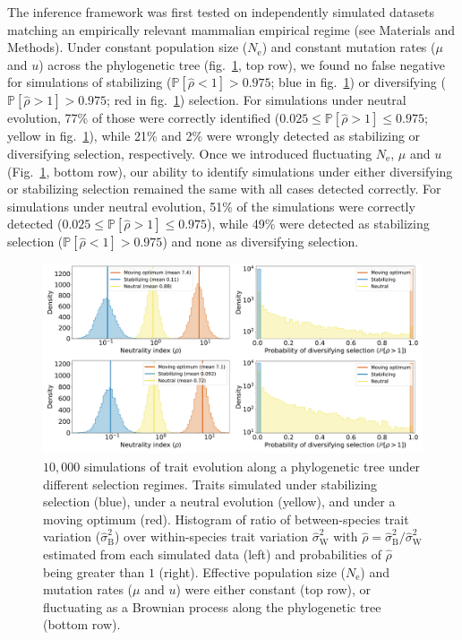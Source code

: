 \documentclass{article}
\newcommand{\Ne}{N_{\text{e}}}
\newcommand{\proba}{\mathbb{P}}
\newcommand{\MutationRatePheno}{\mu}
\newcommand{\MutationRateNuc}{u}
\newcommand{\EstRateBetween}{\widehat{\sigma}^2_{\mathrm{B}}}
\newcommand{\EstRateWhithin}{\widehat{\sigma}^2_{\mathrm{W}}}
\newcommand{\EstNI}{\widehat{\rho}}
\begin{document}
The inference framework was first tested on independently simulated datasets matching an empirically relevant mammalian empirical regime (see Materials and Methods).
Under constant population size ($\Ne$) and constant mutation rates ($\MutationRatePheno$ and $\MutationRateNuc$) across the phylogenetic tree (fig.~\ref{fig:results-simulations}, top row), we found no false negative for simulations of stabilizing ($\proba [\EstNI < 1] > 0.975$; blue in fig.~\ref{fig:results-simulations}) or diversifying ($\proba [\EstNI > 1] > 0.975$; red in fig.~\ref{fig:results-simulations}) selection.
For simulations under neutral evolution, 77\% of those were correctly identified ($0.025 \leq \proba [\EstNI > 1] \leq 0.975$; yellow in fig.~\ref{fig:results-simulations}), while 21\% and 2\% were wrongly detected as stabilizing or diversifying selection, respectively.
Once we introduced fluctuating $\Ne$, $\MutationRatePheno$ and $\MutationRateNuc$(Fig.~\ref{fig:results-simulations}, bottom row), our ability to identify simulations under either diversifying or stabilizing selection remained the same with all cases detected correctly.
For simulations under neutral evolution, 51\% of the simulations were correctly detected ($0.025 \leq \proba [\EstNI > 1] \leq 0.975$), while 49\% were detected as stabilizing selection ($\proba [\EstNI < 1] > 0.975$) and none as diversifying selection.

\begin{figure}[!ht]
    \centering
    \includegraphics[width=\textwidth, page=1] {figure3}
    \caption{
        $10,000$ simulations of trait evolution along a phylogenetic tree under different selection regimes.
        Traits simulated under stabilizing selection (blue), under a neutral evolution (yellow), and under a moving optimum (red).
        Histogram of ratio of between-species trait variation ($\EstRateBetween$) over within-species trait variation $\EstRateWhithin$ with $\EstNI = \EstRateBetween / \EstRateWhithin$ estimated from each simulated data (left) and probabilities of $\EstNI$ being greater than $1$ (right).
        Effective population size ($\Ne$) and mutation rates ($\MutationRatePheno$ and $\MutationRateNuc$) were either constant (top row), or fluctuating as a Brownian process along the phylogenetic tree (bottom row).
    }
    \label{fig:results-simulations}
\end{figure}
\end{document}
